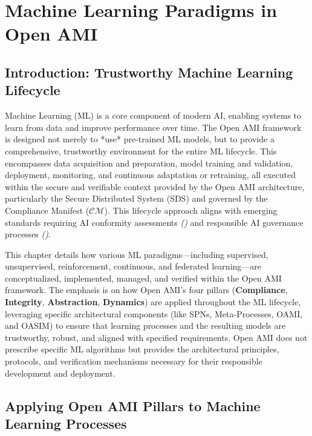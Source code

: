 \documentclass[12pt,a4paper]{report}
\renewcommand{\citep}[1]{\textit{\scriptsize{(\cite{#1})}}}
\newcommand{\Compliance}{\textbf{Compliance}}
\newcommand{\Integrity}{\textbf{Integrity}}
\newcommand{\Abstraction}{\textbf{Abstraction}}
\newcommand{\Dynamics}{\textbf{Dynamics}}
\begin{document}
		\chapter{Machine Learning Paradigms in Open AMI} %
	\label{ch:machine_learning}
	
	\section{Introduction: Trustworthy Machine Learning Lifecycle} %
	\label{sec:3-1} %
	
	Machine Learning (ML) is a core component of modern AI, enabling systems to learn from data and improve performance over time. The Open AMI framework is designed not merely to *use* pre-trained ML models, but to provide a comprehensive, trustworthy environment for the entire ML lifecycle. This encompasses data acquisition and preparation, model training and validation, deployment, monitoring, and continuous adaptation or retraining, all executed within the secure and verifiable context provided by the Open AMI architecture, particularly the Secure Distributed System (SDS) and governed by the Compliance Manifest ($\mathcal{CM}$). This lifecycle approach aligns with emerging standards requiring AI conformity assessments \citep{Navigating_AI_Conformity_2025} and responsible AI governance processes \citep{Responsible_AI_Governance_Review_2024}.
	
	This chapter details how various ML paradigms—including supervised, unsupervised, reinforcement, continuous, and federated learning—are conceptualized, implemented, managed, and verified within the Open AMI framework. The emphasis is on how Open AMI's four pillars (\Compliance, \Integrity, \Abstraction, \Dynamics) are applied throughout the ML lifecycle, leveraging specific architectural components (like SPNs, Meta-Processes, OAMI, and OASIM) to ensure that learning processes and the resulting models are trustworthy, robust, and aligned with specified requirements. Open AMI does not prescribe specific ML algorithms but provides the architectural principles, protocols, and verification mechanisms necessary for their responsible development and deployment.
	
	\section{Applying Open AMI Pillars to Machine Learning Processes} %
	\label{sec:ml_pillars_application} %
	
\end{document}
